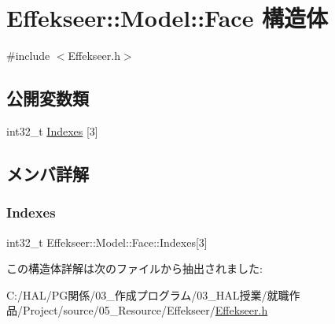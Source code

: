 \hypertarget{struct_effekseer_1_1_model_1_1_face}{}\section{Effekseer\+:\+:Model\+:\+:Face 構造体}
\label{struct_effekseer_1_1_model_1_1_face}


{\ttfamily \#include $<$Effekseer.\+h$>$}

\subsection*{公開変数類}
\begin{DoxyCompactItemize}
\item 
int32\+\_\+t \mbox{\hyperlink{struct_effekseer_1_1_model_1_1_face_aead573cd4f9b93d98f7181222eb5433c}{Indexes}} \mbox{[}3\mbox{]}
\end{DoxyCompactItemize}


\subsection{メンバ詳解}
\mbox{\label{struct_effekseer_1_1_model_1_1_face_aead573cd4f9b93d98f7181222eb5433c}} 
\subsubsection{\texorpdfstring{Indexes}{Indexes}}
{\footnotesize\ttfamily int32\+\_\+t Effekseer\+::\+Model\+::\+Face\+::\+Indexes\mbox{[}3\mbox{]}}



この構造体詳解は次のファイルから抽出されました\+:\begin{DoxyCompactItemize}
\item 
C\+:/\+H\+A\+L/\+P\+G関係/03\+\_\+作成プログラム/03\+\_\+\+H\+A\+L授業/就職作品/\+Project/source/05\+\_\+\+Resource/\+Effekseer/\mbox{\hyperlink{_effekseer_8h}{Effekseer.\+h}}\end{DoxyCompactItemize}
